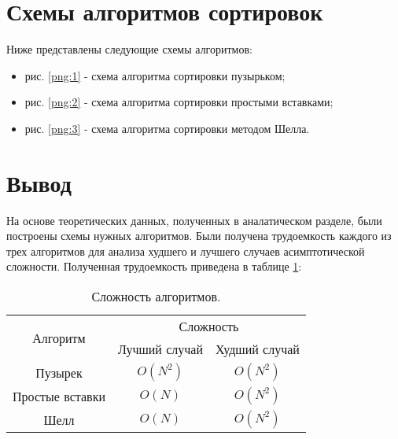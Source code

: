 \section{Схемы алгоритмов сортировок}
Ниже представлены следующие схемы алгоритмов:
\newpage
\begin{itemize}
	\item рис. \ref{png:1} - схема алгоритма сортировки пузырьком;
	\begin{figure}[H]
	\end{figure} 
	
	\newpage
	\item рис. \ref{png:2} - схема алгоритма сортировки простыми вставками;
	\begin{figure}[H]
	\end{figure} 
	
	\newpage
	\item рис. \ref{png:3} - схема алгоритма сортировки методом Шелла.
	\begin{figure}[H]
	\end{figure}
\end{itemize}

\section{Вывод}
На основе теоретических данных, полученных в аналатическом разделе, были построены схемы нужных алгоритмов. Были получена трудоемкость каждого из трех алгоритмов для анализа худшего и лучшего случаев асимптотической сложности. Полученная трудоемкость приведена в таблице \ref{table:ref1}:

\begin{table}[ht!]
	\centering
	\captionsetup{singlelinecheck = false, justification=raggedleft}
	\caption{Сложность алгоритмов.}
	\label{table:ref1}
	\begin{tabular}{|c|c|c|}
		\hline
		\multirow{2}{*}{Алгоритм}& \multicolumn{2}{c|}{Сложность} \\ \cline{2-3} 
		                         & Лучший случай & Худший случай \\
		\hline
		Пузырек & $O(N^2)$  & $O(N^2)$ \\
		\hline
		Простые вставки & $O(N)$  & $O(N^2)$ \\
		\hline
		Шелл & $O(N)$  & $O(N^2)$ \\
		\hline
	\end{tabular}
\end{table}